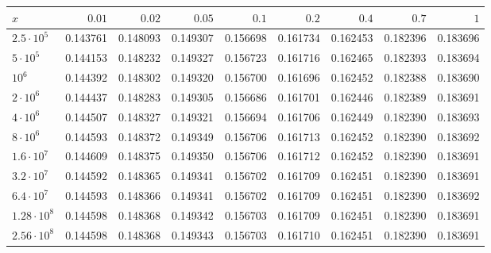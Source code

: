 \begin{tabular}{lrrrrrrrr}
\toprule
$x$ & $0.01$ & $0.02$ & $0.05$ & $0.1$ & $0.2$ & $0.4$ & $0.7$ & $1$ \\
\midrule
$2.5\cdot 10^{5}$ & 0.143761 & 0.148093 & 0.149307 & 0.156698 & 0.161734 & 0.162453 & 0.182396 & 0.183696 \\
$5\cdot 10^{5}$ & 0.144153 & 0.148232 & 0.149327 & 0.156723 & 0.161716 & 0.162465 & 0.182393 & 0.183694 \\
$10^{6}$ & 0.144392 & 0.148302 & 0.149320 & 0.156700 & 0.161696 & 0.162452 & 0.182388 & 0.183690 \\
$2\cdot 10^{6}$ & 0.144437 & 0.148283 & 0.149305 & 0.156686 & 0.161701 & 0.162446 & 0.182389 & 0.183691 \\
$4\cdot 10^{6}$ & 0.144507 & 0.148327 & 0.149321 & 0.156694 & 0.161706 & 0.162449 & 0.182390 & 0.183693 \\
$8\cdot 10^{6}$ & 0.144593 & 0.148372 & 0.149349 & 0.156706 & 0.161713 & 0.162452 & 0.182390 & 0.183692 \\
$1.6\cdot 10^{7}$ & 0.144609 & 0.148375 & 0.149350 & 0.156706 & 0.161712 & 0.162452 & 0.182390 & 0.183691 \\
$3.2\cdot 10^{7}$ & 0.144592 & 0.148365 & 0.149341 & 0.156702 & 0.161709 & 0.162451 & 0.182390 & 0.183691 \\
$6.4\cdot 10^{7}$ & 0.144593 & 0.148366 & 0.149341 & 0.156702 & 0.161709 & 0.162451 & 0.182390 & 0.183692 \\
$1.28\cdot 10^{8}$ & 0.144598 & 0.148368 & 0.149342 & 0.156703 & 0.161709 & 0.162451 & 0.182390 & 0.183691 \\
$2.56\cdot 10^{8}$ & 0.144598 & 0.148368 & 0.149343 & 0.156703 & 0.161710 & 0.162451 & 0.182390 & 0.183691 \\
\bottomrule
\end{tabular}
